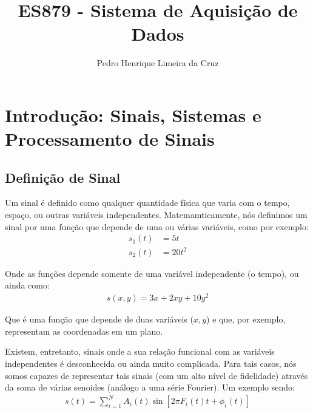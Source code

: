 \documentclass{article}
\author{Pedro Henrique Limeira da Cruz}
\title{ES879 - Sistema de Aquisição de Dados}
\begin{document}
\maketitle
\thispagestyle{empty}


\newpage
\tableofcontents
\newpage

\section{Introdução: Sinais, Sistemas e Processamento de Sinais}

\subsection{Definição de Sinal}
Um sinal é definido como qualquer quantidade física que varia com o tempo, espaço, ou outras variáveis independentes. Matemamticamente, nós definimos um sinal por uma função que depende de uma ou várias variáveis, como por exemplo:
\begin{align*}
   s_1(t) &= 5t \\ 
   s_2(t) &= 20t^2
\end{align*}

Onde as funções depende somente de uma variável independente (o tempo), ou ainda como:
\begin{align*}
    s(x,y) = 3x + 2xy + 10y^2
\end{align*}

Que é uma função que depende de duas variáveis ($x, y$) e que, por exemplo, representam as coordenadas em um plano.

Existem, entretanto, sinais onde a sua relação funcional com as variáveis independentes é desconhecida ou ainda muito complicada. Para tais casos, nós somos capazes de representar tais sinais (com um alto nível de fidelidade) através da soma de várias senoides (análogo a uma série Fourier). Um exemplo sendo:
\begin{align*}
    s(t) = \sum^N_{i=1} A_i(t) \sin{[2\pi F_i(t)t + \phi_i(t)]}
\end{align*}
\end{document}
